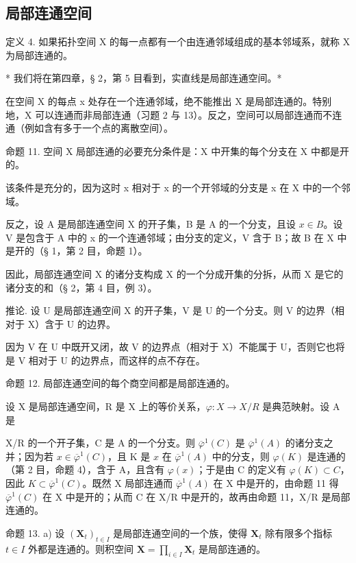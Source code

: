 \subsection{局部连通空间}

定义 4. 如果拓扑空间 X 的每一点都有一个由连通邻域组成的基本邻域系，就称 X 为局部连通的。

* 我们将在第四章，§ 2，第 5 目看到，实直线是局部连通空间。*

在空间 X 的每点 x 处存在一个连通邻域，绝不能推出 X 是局部连通的。特别地，X 可以连通而非局部连通（习题 2 与 13）。反之，空间可以局部连通而不连通（例如含有多于一个点的离散空间）。

命题 11. 空间 X 局部连通的必要充分条件是：X 中开集的每个分支在 X 中都是开的。

该条件是充分的，因为这时 x 相对于 x 的一个开邻域的分支是 x 在 X 中的一个邻域。

反之，设 A 是局部连通空间 X 的开子集，B 是 A 的一个分支，且设 \(x \in B\)。设 V 是包含于 A 中的 x 的一个连通邻域；由分支的定义，V 含于 B；故 B 在 X 中是开的（§ 1，第 2 目，命题 1）。

因此，局部连通空间 X 的诸分支构成 X 的一个分成开集的分拆，从而 X 是它的诸分支的和（§ 2，第 4 目，例 3）。

推论. 设 U 是局部连通空间 X 的开子集，V 是 U 的一个分支。则 V 的边界（相对于 X）含于 U 的边界。

因为 V 在 U 中既开又闭，故 V 的边界点（相对于 X）不能属于 U，否则它也将是 V 相对于 U 的边界点，而这样的点不存在。

命题 12. 局部连通空间的每个商空间都是局部连通的。

设 X 是局部连通空间，R 是 X 上的等价关系，\(\varphi: X \to X/R\) 是典范映射。设 A 是

X/R 的一个开子集，C 是 A 的一个分支。则 \(\overline{\varphi}^{1}(C)\) 是 \(\overline{\varphi}^{1}(A)\) 的诸分支之并；因为若 \(x \in \overline{\varphi}^{1}(C)\)，且 K 是 \(x\) 在 \(\overline{\varphi}^{1}(A)\) 中的分支，则 \(\varphi(K)\) 是连通的（第 2 目，命题 4），含于 A，且含有 \(\varphi(x)\)；于是由 C 的定义有 \(\varphi(K) \subset C\)，因此 \(K \subset \overline{\varphi}^{1}(C)\)。既然 X 局部连通而 \(\overline{\varphi}^{1}(A)\) 在 X 中是开的，由命题 11 得 \(\overline{\varphi}^{1}(C)\) 在 X 中是开的；从而 C 在 X/R 中是开的，故再由命题 11，X/R 是局部连通的。

命题 13. a) 设 \((\mathbf{X}_t)_{t \in I}\) 是局部连通空间的一个族，使得 \(\mathbf{X}_t\) 除有限多个指标 \(t \in I\) 外都是连通的。则积空间 \(\mathbf{X} = \prod_{i \in I} \mathbf{X}_t\) 是局部连通的。

